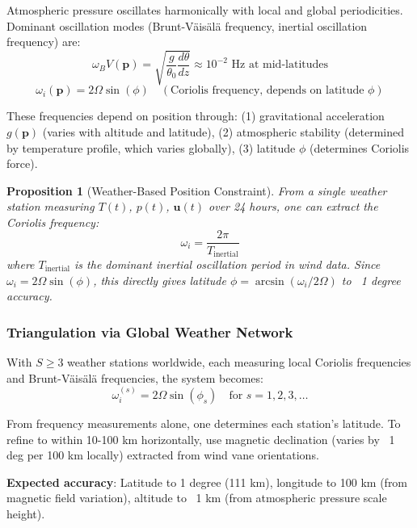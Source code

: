 \documentclass[11pt,twocolumn,a4paper]{article}
\newtheorem{proposition}[theorem]{Proposition}
\theoremstyle{definition}
\begin{document}
Atmospheric pressure oscillates harmonically with local and global periodicities. Dominant oscillation modes (Brunt-Väisälä frequency, inertial oscillation frequency) are:
\[
\omega_BV(\mathbf{p}) = \sqrt{\frac{g}{\theta_0} \frac{d\theta}{dz}} \approx 10^{-2} \text{ Hz at mid-latitudes}
\]
\[
\omega_i(\mathbf{p}) = 2\Omega \sin(\phi) \quad (\text{Coriolis frequency, depends on latitude } \phi)
\]

These frequencies depend on position through: (1) gravitational acceleration $g(\mathbf{p})$ (varies with altitude and latitude), (2) atmospheric stability (determined by temperature profile, which varies globally), (3) latitude $\phi$ (determines Coriolis force).

\begin{proposition}[Weather-Based Position Constraint]
From a single weather station measuring $T(t)$, $p(t)$, $\mathbf{u}(t)$ over 24 hours, one can extract the Coriolis frequency:
\[
\omega_i = \frac{2\pi}{T_{\text{inertial}}}
\]
where $T_{\text{inertial}}$ is the dominant inertial oscillation period in wind data. Since $\omega_i = 2\Omega \sin(\phi)$, this directly gives latitude $\phi = \arcsin(\omega_i / 2\Omega)$ to ~1 degree accuracy.
\end{proposition}

\subsubsection{Triangulation via Global Weather Network}

With $S \geq 3$ weather stations worldwide, each measuring local Coriolis frequencies and Brunt-Väisälä frequencies, the system becomes:
\[
\omega_i^{(s)} = 2\Omega \sin(\phi_s) \quad \text{for } s = 1, 2, 3, \ldots
\]

From frequency measurements alone, one determines each station's latitude. To refine to within 10-100 km horizontally, use magnetic declination (varies by ~1 deg per 100 km locally) extracted from wind vane orientations.

\textbf{Expected accuracy}: Latitude to 1 degree (111 km), longitude to 100 km (from magnetic field variation), altitude to ~1 km (from atmospheric pressure scale height).
\end{document}
